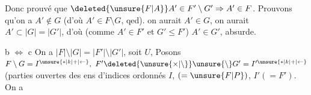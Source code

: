 Donc  prouvé que $\deleted{\unsure{F|A}}A'\in F'\setminus G'\Rightarrow A'\in F$. Prouvons qu'on a $A'\notin G$ (d'où $A'\in F\setminus G$\deleted{)}, qed).  on aurait $A'\in G$, on aurait $A'\subset |G|=|G'|$, d'où (comme $A'\in F'$ et $G'\leq F'$) $A'\in G'$, absurde.


b $\Longleftrightarrow$ c  On a $|F|\setminus|G|=|F'|\setminus|G'|$, soit $U$, Posons $F\setminus G=I^{\unsure{\ast|k|+|\leftarrow}},\ F'\deleted{\unsure{\times|\setminus}}\unsure{\setminus}G'=I'^{\unsure{\ast|k|+|\leftarrow}}$ (parties ouvertes des ens d'indices ordonnés $I$,  $(=\unsure{F|P})$, $I'(=F')$. On a
